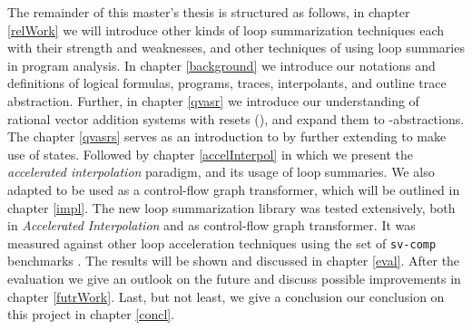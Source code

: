 The remainder of this master's thesis is structured as follows, in chapter \ref{relWork} we will introduce other kinds of loop summarization techniques each with their strength and weaknesses, and other techniques of using loop summaries in program analysis. In chapter \ref{background} we introduce our notations and definitions of logical formulas, programs, traces, interpolants, and outline trace abstraction. Further, in chapter \ref{qvasr} we introduce our understanding of rational vector addition systems with resets (\qvasr), and expand them to \qvasr-abstractions. The chapter \ref{qvasrs} serves as an introduction to \qvasrs by further extending \qvasr to make use of states. Followed by chapter \ref{accelInterpol} in which we present the \textsl{accelerated interpolation} paradigm, and its usage of \qvasr loop summaries. We also adapted \qvasr to be used as a control-flow graph transformer, which will be outlined in chapter \ref{impl}. The new loop summarization library was tested extensively, both in \textsl{Accelerated Interpolation} and as control-flow graph transformer. It was measured against other loop acceleration techniques using the set of \texttt{sv-comp} benchmarks \cite{svcomp}. The results will be shown and discussed in chapter \ref{eval}. After the evaluation we give an outlook on the future and discuss possible improvements in chapter \ref{futrWork}. Last, but not least, we give a conclusion our conclusion on this project in chapter \ref{concl}.

